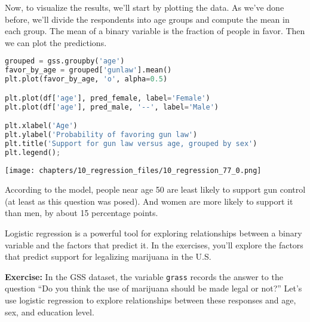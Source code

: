 Now, to visualize the results, we'll start by plotting the data. As
we've done before, we'll divide the respondents into age groups and
compute the mean in each group. The mean of a binary variable is the
fraction of people in favor. Then we can plot the predictions.

\begin{lstlisting}[language=Python,style=source]
grouped = gss.groupby('age')
favor_by_age = grouped['gunlaw'].mean()
plt.plot(favor_by_age, 'o', alpha=0.5)

plt.plot(df['age'], pred_female, label='Female')
plt.plot(df['age'], pred_male, '--', label='Male')

plt.xlabel('Age')
plt.ylabel('Probability of favoring gun law')
plt.title('Support for gun law versus age, grouped by sex')
plt.legend();
\end{lstlisting}

\begin{center}
\texttt{[image: chapters/10\_regression\_files/10\_regression\_77\_0.png]}
\end{center}

According to the model, people near age 50 are least likely to support
gun control (at least as this question was posed). And women are more
likely to support it than men, by about 15 percentage points.

Logistic regression is a powerful tool for exploring relationships
between a binary variable and the factors that predict it. In the
exercises, you'll explore the factors that predict support for
legalizing marijuana in the U.S.

\textbf{Exercise:} In the GSS dataset, the variable
\passthrough{\lstinline!grass!} records the answer to the question ``Do
you think the use of marijuana should be made legal or not?'' Let's use
logistic regression to explore relationships between these responses and
age, sex, and education level.

